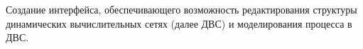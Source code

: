 {\aim} Создание интерфейса, обеспечивающего возможность редактирования структуры динамических вычислительных сетях (далее ДВС) и моделирования процесса в ДВС.
    

